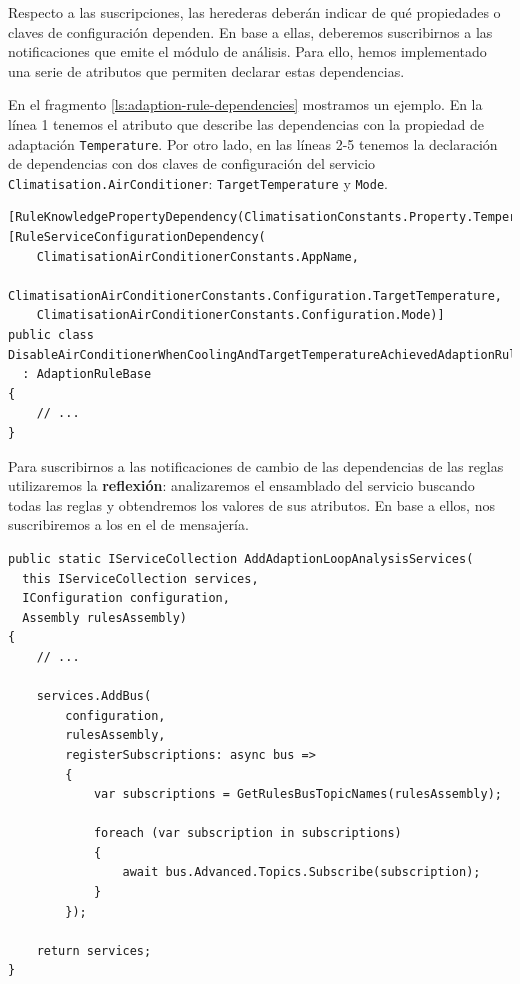 Respecto a las suscripciones, las herederas deberán indicar de qué propiedades o claves de configuración dependen. En base a ellas, deberemos suscribirnos a las notificaciones que emite el módulo de análisis. Para ello, hemos implementado una serie de atributos que permiten declarar estas dependencias.

En el fragmento \ref{ls:adaption-rule-dependencies} mostramos un ejemplo. En la línea 1 tenemos el atributo que describe las dependencias con la propiedad de adaptación \texttt{Temperature}. Por otro lado, en las líneas 2-5 tenemos la declaración de dependencias con dos claves de configuración del servicio \texttt{Climatisation.AirConditioner}: \texttt{TargetTemperature} y \texttt{Mode}.

\begin{lstlisting}[language={[Sharp]C},caption={Las reglas declaran sus dependencias sobre propiedades de adaptación usando atributos. Estos se utilizarán para las suscripciones a los temas de los eventos.},captionpos=b, label=ls:adaption-rule-dependencies]
[RuleKnowledgePropertyDependency(ClimatisationConstants.Property.Temperature)]
[RuleServiceConfigurationDependency(
    ClimatisationAirConditionerConstants.AppName,
    ClimatisationAirConditionerConstants.Configuration.TargetTemperature,
    ClimatisationAirConditionerConstants.Configuration.Mode)]
public class DisableAirConditionerWhenCoolingAndTargetTemperatureAchievedAdaptionRule
  : AdaptionRuleBase
{
    // ...
}
\end{lstlisting}

Para suscribirnos a las notificaciones de cambio de las dependencias de las reglas utilizaremos la \textbf{reflexión}: analizaremos el ensamblado del servicio buscando todas las reglas y obtendremos los valores de sus atributos. En base a ellos, nos suscribiremos a los  en el  de mensajería.

\begin{lstlisting}[language={[Sharp]C},caption={Para suscribirnos a los \foreign{english}{topics} de las notificaciones obtenemos las dependencias de las reglas mediante reflexión},captionpos=b, label=ls:rules-registration]
public static IServiceCollection AddAdaptionLoopAnalysisServices(
  this IServiceCollection services,
  IConfiguration configuration,
  Assembly rulesAssembly)
{
    // ...

    services.AddBus(
        configuration,
        rulesAssembly,
        registerSubscriptions: async bus =>
        {
            var subscriptions = GetRulesBusTopicNames(rulesAssembly);

            foreach (var subscription in subscriptions)
            {
                await bus.Advanced.Topics.Subscribe(subscription);
            }
        });

    return services;
}
\end{lstlisting}

